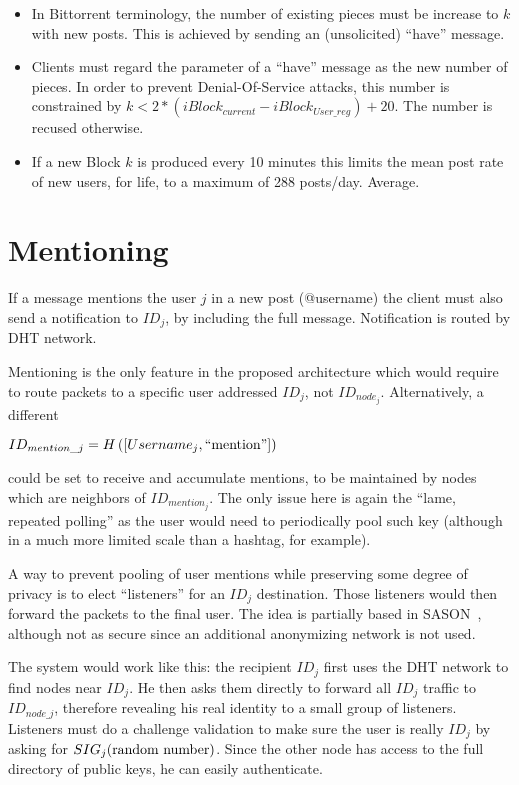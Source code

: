 \documentclass[a4paper,10pt]{article}
\begin{document}
\begin{itemize}
 \item In Bittorrent terminology, the number of existing pieces must be increase to $k$ with new posts. This is achieved by sending an (unsolicited) ``have'' message.
 \item Clients must regard the parameter of a ``have'' message as the new number of pieces. In order to prevent Denial-Of-Service attacks, this number is constrained by $k < 2 * (iBlock_{current} - iBlock_{User\_reg}) + 20$. The number is recused otherwise.
 \item If a new Block $k$ is produced every 10 minutes this limits the mean post rate of new users, for life, to a maximum of 288 posts/day. Average.
\end{itemize}

\section{Mentioning}
\label{sec:mentioning}

If a message mentions the user $j$ in a new post (@username) the client must also send a notification to $ID_j$, by including the full message. Notification is routed by DHT network.

Mentioning is the only feature in the proposed architecture which would require to route packets to a specific user addressed $ID_j$, not $ID_{node_j}$. Alternatively, a different 

$ID_{mention\_j} = H\left( [Username_j,\textnormal{``mention''}] \right)$

could be set to receive and accumulate mentions, to be maintained by nodes which are neighbors of $ID_{mention_j}$. The only issue here is again the ``lame, repeated polling'' as the user would need to periodically pool such key (although in a much more limited scale than a hashtag, for example).

A way to prevent pooling of user mentions while preserving some degree of privacy is to elect ``listeners'' for an $ID_j$ destination. Those listeners would then forward the packets to the final user. The idea is partially based in SASON~\cite{tsai2006scalable}, although not as secure since an additional anonymizing network is not used.

The system would work like this: the recipient $ID_j$ first uses the DHT network to find nodes near $ID_j$. He then asks them directly to forward all $ID_j$ traffic to $ID_{node\_j}$, therefore revealing his real identity to a small group of listeners. Listeners must do a challenge validation to make sure the user is really $ID_j$ by asking for $SIG_j( \textnormal{random number} )$. Since the other node has access to the full directory of public keys, he can easily authenticate.
\end{document}
